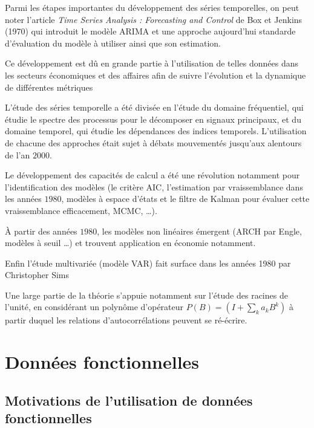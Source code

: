 Parmi les étapes importantes du développement des séries temporelles, on peut noter l'article \emph{Time Series Analysis : Forecasting and Control} de Box et Jenkins (1970) qui introduit le modèle ARIMA et une approche aujourd'hui standarde d'évaluation du modèle à utiliser ainsi que son estimation.



Ce développement est dû en grande partie à l'utilisation de telles données dans les secteurs économiques et des affaires afin de suivre l'évolution et la dynamique de différentes métriques

L'étude des séries temporelle a été divisée en l'étude du domaine fréquentiel, qui étudie le spectre des processus pour le décomposer en signaux principaux, et du domaine temporel, qui étudie les dépendances des indices temporels. L'utilisation de chacune des approches était sujet à débats mouvementés jusqu'aux alentours de l'an $2000$. 

Le développement des capacités de calcul a été une révolution notamment pour l'identification des modèles (le critère AIC, l'estimation par vraissemblance dans les années $1980$, modèles à espace d'états et le filtre de Kalman pour évaluer cette vraissemblance efficacement, MCMC, \ldots).

À partir des années $1980$, les modèles non linéaires émergent (ARCH par Engle, modèles à seuil \ldots) et trouvent application en économie notamment.

Enfin l'étude multivariée (modèle VAR) fait surface dans les années 1980 par Christopher Sims~\cite[ \href{https://pubs.aeaweb.org/doi/pdf/10.1257/jep.15.4.101}{lien de l'article} ]{VAR_paper}

Une large partie de la théorie s'appuie notamment sur l'étude des racines de l'unité, en considérant un polynôme d'opérateur $P(B) = (I + \sum_k a_k B^k)$ à partir duquel les relations d'autocorrélations peuvent se ré-écrire.

\section{Données fonctionnelles}

\subsection{Motivations de l'utilisation de données fonctionnelles}



